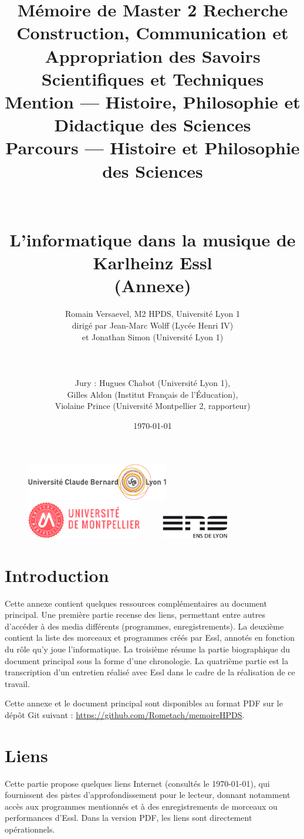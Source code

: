 \documentclass[a4paper,12pt]{article}
\title{\LARGE Mémoire de Master 2 Recherche \\
\large Construction, Communication et Appropriation des Savoirs Scientifiques et Techniques \\
\normalsize Mention --- Histoire, Philosophie et Didactique des Sciences \\
\normalsize Parcours --- Histoire et Philosophie des Sciences \\ ~ \\ ~ \\
\LARGE L'informatique dans la musique de Karlheinz Essl \\ \LARGE (Annexe)}
\date{\normalsize \today}
\author{\normalsize Romain Versaevel, M2 HPDS, Université Lyon 1\\
\normalsize dirigé par Jean-Marc Wolff (Lycée Henri IV) \\
\normalsize et Jonathan Simon (Université Lyon 1) \\ \\ \\ \\
\normalsize Jury : Hugues Chabot (Université Lyon 1), \\
\normalsize Gilles Aldon (Institut Français de l'Éducation), \\
\normalsize Violaine Prince (Université Montpellier 2, rapporteur)}
\begin{document}
\begin{figure}
\begin{center}
\includegraphics[height=1.6cm]{images/logo-lyon1.png}~~~~~
\includegraphics[height=1.6cm]{images/logo-montpellier.png}~~~~~
\includegraphics[height=1cm]{images/logo-ens.jpg}
\end{center}
\end{figure}
\maketitle
\newpage

\tableofcontents

\newpage
\section{Introduction}

Cette annexe contient quelques ressources complémentaires au document principal. Une première partie recense des liens, permettant entre autres d'accéder à des media différents (programmes, enregistrements). La deuxième contient la liste des morceaux et programmes créés par Essl, annotés en fonction du rôle qu'y joue l'informatique. La troisième résume la partie biographique du document principal sous la forme d'une chronologie. La quatrième partie est la transcription d'un entretien réalisé avec Essl dans le cadre de la réalisation de ce travail.

Cette annexe et le document principal sont disponibles au format PDF sur le dépôt Git suivant :
\href{https://github.com/Rometach/memoireHPDS}{https://github.com/Rometach/memoireHPDS}.

\newpage
\section{Liens}

Cette partie propose quelques liens Internet (consultés le \today), qui fournissent des pistes d'approfondissement pour le lecteur, donnant notamment accès aux programmes mentionnés et à des enregistrements de morceaux ou performances d'Essl. Dans la version PDF, les liens sont directement opérationnels.
\end{document}

